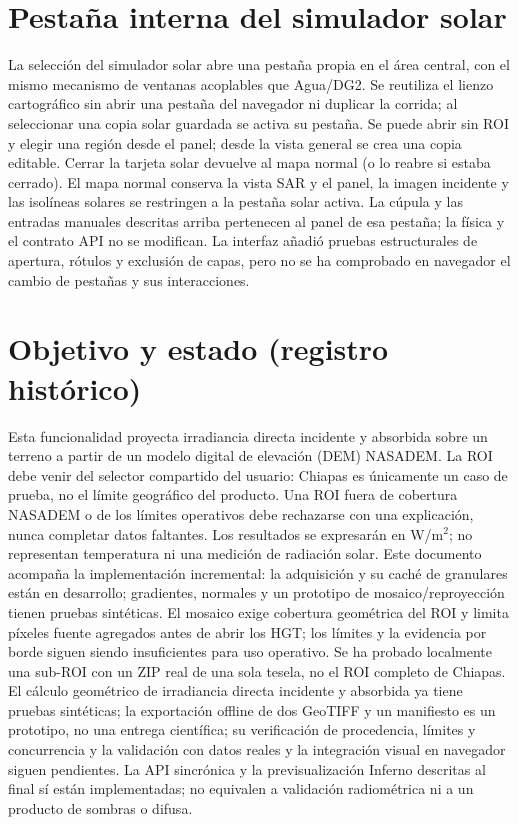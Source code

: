 \documentclass[11pt,a4paper]{article}
\begin{document}
\section{Pestaña interna del simulador solar}
La selección del simulador solar abre una pestaña propia en el área central, con el mismo mecanismo de ventanas acoplables que Agua/DG2. Se reutiliza el lienzo cartográfico sin abrir una pestaña del navegador ni duplicar la corrida; al seleccionar una copia solar guardada se activa su pestaña. Se puede abrir sin ROI y elegir una región desde el panel; desde la vista general se crea una copia editable. Cerrar la tarjeta solar devuelve al mapa normal (o lo reabre si estaba cerrado). El mapa normal conserva la vista SAR y el panel, la imagen incidente y las isolíneas solares se restringen a la pestaña solar activa. La cúpula y las entradas manuales descritas arriba pertenecen al panel de esa pestaña; la física y el contrato API no se modifican. La interfaz añadió pruebas estructurales de apertura, rótulos y exclusión de capas, pero no se ha comprobado en navegador el cambio de pestañas y sus interacciones.

\section{Objetivo y estado (registro histórico)}
Esta funcionalidad proyecta irradiancia directa incidente y absorbida sobre un terreno a partir de un modelo digital de elevación (DEM) NASADEM. La ROI debe venir del selector compartido del usuario: Chiapas es únicamente un caso de prueba, no el límite geográfico del producto. Una ROI fuera de cobertura NASADEM o de los límites operativos debe rechazarse con una explicación, nunca completar datos faltantes. Los resultados se expresarán en W/m$^2$; no representan temperatura ni una medición de radiación solar. Este documento acompaña la implementación incremental: la adquisición y su caché de granulares están en desarrollo; gradientes, normales y un prototipo de mosaico/reproyección tienen pruebas sintéticas. El mosaico exige cobertura geométrica del ROI y limita píxeles fuente agregados antes de abrir los HGT; los límites y la evidencia por borde siguen siendo insuficientes para uso operativo. Se ha probado localmente una sub-ROI con un ZIP real de una sola tesela, no el ROI completo de Chiapas. El cálculo geométrico de irradiancia directa incidente y absorbida ya tiene pruebas sintéticas; la exportación offline de dos GeoTIFF y un manifiesto es un prototipo, no una entrega científica; su verificación de procedencia, límites y concurrencia y la validación con datos reales y la integración visual en navegador siguen pendientes. La API sincrónica y la previsualización Inferno descritas al final sí están implementadas; no equivalen a validación radiométrica ni a un producto de sombras o difusa.
\end{document}
